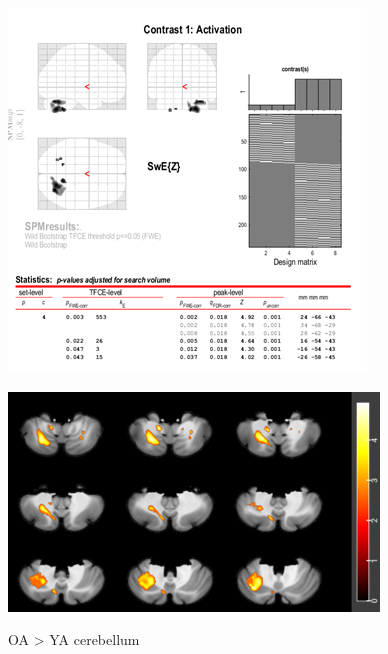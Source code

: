\documentclass[a4paper,fleqn]{cas-sc}
\begin{document}
\begin{figure}[ht]
    \centering
    \begin{minipage}{0.48\textwidth}
        \centering
        \includegraphics[clip, trim=0 0 0 0, width=\linewidth]{figs/OAYAcereb_spm.png} %
         \label{fig:a}
    \end{minipage}
    \begin{minipage}{0.48\textwidth}
        \centering
        \includegraphics[clip, trim=0 0 0 0, width=\linewidth]{figs/OAYAcereb_slice.png} %
         \label{fig:b}
    \end{minipage}
    \caption{OA > YA cerebellum}
    \label{fig:OAYAcereb_slice}
\end{figure}
\end{document}
